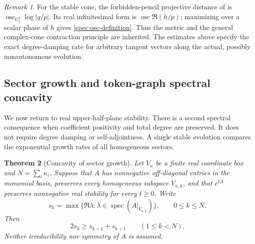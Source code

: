 \documentclass[reqno]{amsart}
\newtheorem{theorem}{Theorem}[section]
\theoremstyle{definition}
\theoremstyle{remark}
\newtheorem{remark}[theorem]{Remark}
\newcommand{\D}{\mathbb D}
\begin{document}
\begin{remark}\label{spec:projective-attribution}
For the stable cone, the forbidden-pencil projective distance of
\cite{Dubois09} is
\(\operatorname{osc}_{\D_1^d}\log|q/p|\).  Its real infinitesimal
form is \(\operatorname{osc}\Re(h/p)\); maximizing over a scalar
phase of \(h\) gives \eqref{spec:osc-definition}.  Thus the metric
and the general complex-cone contraction principle are inherited.
The estimates above specify the exact degree-damping rate for arbitrary
tangent vectors along the actual, possibly nonautonomous evolution.
\end{remark}


\subsection{Sector growth and token-graph spectral concavity}
\label{sector:section}

We now return to real upper-half-plane stability.
There is a second spectral consequence when coefficient positivity and
total degree are preserved. It does not require degree damping or
self-adjointness. A single stable evolution compares the exponential
growth rates of all homogeneous sectors.

\begin{theorem}[Concavity of sector growth]\label{sector:growth}
Let \(V_\kappa\) be a finite real coordinate box and
\(N=\sum_i\kappa_i\). Suppose that \(A\) has nonnegative off-diagonal
entries in the monomial basis, preserves every homogeneous subspace
\(V_{\kappa,k}\), and that \(e^{tA}\) preserves nonnegative real
stability for every \(t\ge0\). Write
\[
 s_k=\max\{\Re\lambda:\lambda\in
             \operatorname{spec}(A|_{V_{\kappa,k}})\},
 \qquad 0\le k\le N.
\]
Then
\[
 2s_k\ge s_{k-1}+s_{k+1}\qquad(1\le k<N).
\]
Neither irreducibility nor symmetry of \(A\) is assumed.
\end{theorem}
\end{document}

